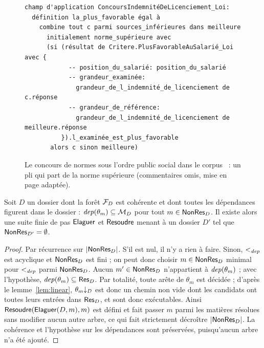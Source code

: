 \documentclass[review]{jflart}
\begin{document}
\begin{figure}
\begin{Verbatim}[frame=single, label={Code du travail, article L. 2251-1}]
champ d'application ConcoursIndemnitéDeLicenciement_Loi:
  définition la_plus_favorable égal à
    combine tout c parmi sources_inférieures dans meilleure
      initialement norme_supérieure avec
      (si (résultat de Critere.PlusFavorableAuSalarié_Loi avec {
            -- position_du_salarié: position_du_salarié
            -- grandeur_examinée:
              grandeur_de_l_indemnité_de_licenciement de c.réponse
            -- grandeur_de_référence:
              grandeur_de_l_indemnité_de_licenciement de meilleure.réponse
          }).l_examinée_est_plus_favorable
       alors c sinon meilleure)
\end{Verbatim}
\caption{Le concours de normes sous l'ordre public social dans le
  corpus~\cite{corpuslumo} : un pli qui part de la norme supérieure
  (commentaires omis, mise en page adaptée).}
\label{fig:concours}
\end{figure}

\begin{theo}[Résolution]\label{thm:resolution}
Soit \(D\) un dossier dont la forêt \(\mathcal{F}_D\) est cohérente et dont toutes
les dépendances figurent dans le dossier : \(\mathit{dep}(\theta_m)\subseteq\mathcal{M}_D\)
pour tout \(m\in\mathsf{NonRes}_D\). Il existe alors une suite finie de pas \(\mathsf{Elaguer}\) et
\(\mathsf{Resoudre}\) menant à un dossier \(D'\) tel que \(\mathsf{NonRes}_{D'}=\emptyset\).
\end{theo}
\begin{proof}
Par récurrence sur \(|\mathsf{NonRes}_D|\). S'il est nul, il n'y a rien à faire. Sinon,
\(<_{\mathit{dep}}\) est acyclique et \(\mathsf{NonRes}_D\) est fini ; on peut donc choisir
\(m\in\mathsf{NonRes}_D\) minimal pour \(<_{\mathit{dep}}\) parmi \(\mathsf{NonRes}_D\). Aucun
\(m'\in\mathsf{NonRes}_D\) n'appartient à \(\mathit{dep}(\theta_m)\) ; avec l'hypothèse,
\(\mathit{dep}(\theta_m)\subseteq\mathsf{Res}_D\). Par totalité, toute arête de \(\theta_m\) est
décidée ; d'après le lemme~\ref{lem:linear}, \({\theta_m}{\downarrow_D}\) est donc un
chemin non vide dont les candidats ont toutes leurs entrées dans \(\mathsf{Res}_D\), et
sont donc exécutables. Ainsi \(\mathsf{Resoudre}(\mathsf{Elaguer}(D,m),m)\) est défini et fait
passer \(m\) parmi les matières résolues sans modifier aucun autre arbre, ce qui fait
strictement décroître \(|\mathsf{NonRes}_D|\). La cohérence et l'hypothèse sur les
dépendances sont préservées, puisqu'aucun arbre n'a été ajouté.
\end{proof}
\end{document}
